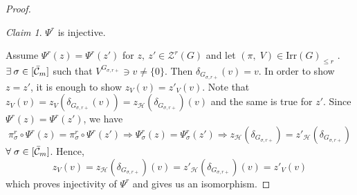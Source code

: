 \documentclass[11 pt]{article}
\numberwithin{equation}{subsection}
\theoremstyle{definition}
\theoremstyle{remark}
\newtheorem{claim}{Claim}[theorem]
\theoremstyle{conjecture}
\newcommand{\Irr}{\mathrm{Irr}}
\newcommand{\HH}{\mathcal H}
\newcommand{\ZZ}{\mathcal{Z}}
\newcommand{\mcC}{\mathcal C}
\begin{document}
\begin{proof}
    \begin{claim}
        $\Psi^r$ is injective. 
    \end{claim}
     Assume $\Psi^r (z) = \Psi^r (z')$ for $z,\:z' \in \ZZ^r(G)$ and let $(\pi,\; V) \in \Irr(G)_{\leq r}$ .$\exists \:\sigma\in [\Bar{\mcC}_m] $ such that $V^{G_{\sigma, r+}}\ni v \neq \{0\}$. Then $\delta_{G_{\sigma, r+}}(v)=v$. In order to show $z=z'$, it is enough to show $z_V(v) = {z'}_V(v)$. Note that $z_V(v)=z_V(\delta_{G_{\sigma, r+}}(v))=z_\HH(\delta_{G_{\sigma, r+}})(v)$ and the same is true for $z'$. Since $\Psi^r (z) = \Psi^r (z')$, we have 
    \[
    \pi^r_\sigma \circ \Psi^r (z) = \pi^r_\sigma \circ \Psi^r(z') \Rightarrow \Psi^r_\sigma(z)=\Psi^r_\sigma(z')\Rightarrow z_\HH(\delta_{G_{\sigma, r+}})= {z'}_\HH(\delta_{G_{\sigma, r+}})
    \]
    $\forall \;\sigma\in [\Bar{\mcC}_m]$. Hence,
    \[
    z_V(v) = z_\HH(\delta_{G_{\sigma, r+}})(v)= {z'}_\HH(\delta_{G_{\sigma, r+}})(v)= {z'}_V(v)
    \]
    which proves injectivity of $\Psi^r$ and gives us an isomorphism. 
\end{proof}
\end{document}

